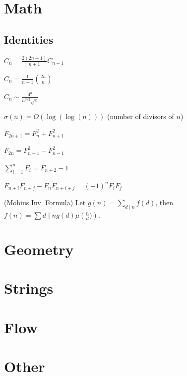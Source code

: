 
\section{Math}
\subsection{Identities}
{
	$C_n = \frac{2(2n-1)}{n+1} C_{n-1}$

	$C_n = \frac{1}{n+1} \binom{2n}{n}$

	$C_n \sim \frac{4^n}{n^{3/2}\sqrt{\pi}}$

	$\sigma(n) = O(\log(\log(n)))$ (number of divisors of $n$)

	$F_{2n+1} = F_{n}^2 + F_{n+1}^2$

	$F_{2n} = F_{n+1}^2 - F_{n-1}^2$

	$\sum_{i=1}^n F_i = F_{n+2}-1$

	$F_{n+i}F_{n+j} - F_nF_{n+i+j} = (-1)^n F_iF_j$

	(Möbius Inv. Formula)
	Let $g(n) = \sum_{d\mid n} f(d)$, then $f(n)=\sum{d\mid n} g(d) \mu\left(\frac{n}{d})\right)$.
}

\section{Geometry}
\section{Strings}

\section{Flow}

\section{Other}


